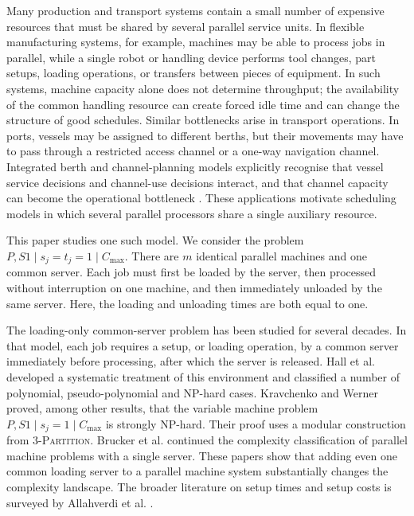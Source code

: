 \documentclass[11pt]{article}
\begin{document}
Many production and transport systems contain a small number of expensive
resources that must be shared by several parallel service units. In flexible
manufacturing systems, for example, machines may be able to process jobs in
parallel, while a single robot or handling device performs tool changes, part
setups, loading operations, or transfers between pieces of equipment. In such
systems, machine capacity alone does not determine throughput; the availability
of the common handling resource can create forced idle time and can change the
structure of good schedules. Similar bottlenecks arise in transport operations.
In ports, vessels may be assigned to different berths, but their movements may
have to pass through a restricted access channel or a one-way navigation channel.
Integrated berth and channel-planning models explicitly recognise that vessel
service decisions and channel-use decisions interact, and that channel capacity
can become the operational bottleneck \cite{ZhenLiangZhugeLeeChew2017,
LiuLiShengWang2021,ZhangZheng2020}. These applications motivate scheduling
models in which several parallel processors share a single auxiliary resource.

This paper studies one such model. We consider the problem
$
        P,S1\mid s_j=t_j=1\mid C_{\max}.
$
There are \(m\) identical parallel machines and one common server. Each job must
first be loaded by the server, then processed without interruption on one
machine, and then immediately unloaded by the same server. Here, the loading and unloading
times are both equal to one. 

The loading-only common-server problem has been studied for several decades.
In that model, each job requires a setup, or loading operation, by a common
server immediately before processing, after which the server is released.
Hall et al. \cite{HallPottsSriskandarajah2000} developed a
systematic treatment of this environment and classified a number of polynomial,
pseudo-polynomial and NP-hard cases. Kravchenko and Werner
\cite{KravchenkoWerner1997} proved, among other results, that the variable
machine problem
$P,S1\mid s_j=1\mid C_{\max}$
is strongly NP-hard. Their proof uses a modular construction from
\textsc{3-Partition}. Brucker et al.
\cite{BruckerDhaenensFlipoKnustKravchenkoWerner2002} continued the complexity
classification of parallel machine problems with a single server. These papers
show that adding even one common loading server to a parallel machine system
substantially changes the complexity landscape. The broader literature on setup
times and setup costs is surveyed by Allahverdi et al.
\cite{AllahverdiNgChengKovalyov2008}.
\end{document}
